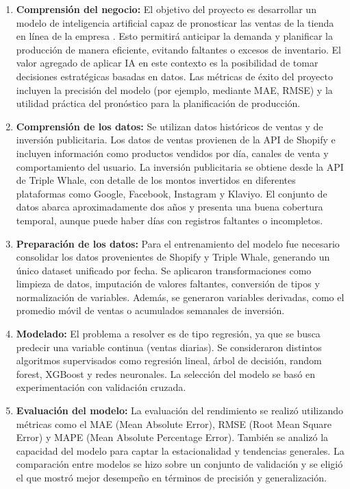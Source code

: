 \documentclass[
11pt, %
]{charter}
\begin{document}
\begin{enumerate}
  \item \textbf{Comprensión del negocio:}  
  El objetivo del proyecto es desarrollar un modelo de inteligencia artificial capaz de pronosticar las ventas de la tienda en línea de la empresa \empclientename. Esto permitirá anticipar la demanda y planificar la producción de manera eficiente, evitando faltantes o excesos de inventario. El valor agregado de aplicar IA en este contexto es la posibilidad de tomar decisiones estratégicas basadas en datos. Las métricas de éxito del proyecto incluyen la precisión del modelo (por ejemplo, mediante MAE, RMSE) y la utilidad práctica del pronóstico para la planificación de producción.

  \item \textbf{Comprensión de los datos:}  
  Se utilizan datos históricos de ventas y de inversión publicitaria. Los datos de ventas provienen de la API de Shopify e incluyen información como productos vendidos por día, canales de venta y comportamiento del usuario. La inversión publicitaria se obtiene desde la API de Triple Whale, con detalle de los montos invertidos en diferentes plataformas como Google, Facebook, Instagram y Klaviyo. El conjunto de datos abarca aproximadamente dos años y presenta una buena cobertura temporal, aunque puede haber días con registros faltantes o incompletos.

  \item \textbf{Preparación de los datos:}  
  Para el entrenamiento del modelo fue necesario consolidar los datos provenientes de Shopify y Triple Whale, generando un único dataset unificado por fecha. Se aplicaron transformaciones como limpieza de datos, imputación de valores faltantes, conversión de tipos y normalización de variables. Además, se generaron variables derivadas, como el promedio móvil de ventas o acumulados semanales de inversión.

  \item \textbf{Modelado:}  
  El problema a resolver es de tipo regresión, ya que se busca predecir una variable continua (ventas diarias). Se consideraron distintos algoritmos supervisados como regresión lineal, árbol de decisión, random forest, XGBoost y redes neuronales. La selección del modelo se basó en experimentación con validación cruzada.

  \item \textbf{Evaluación del modelo:}  
  La evaluación del rendimiento se realizó utilizando métricas como el MAE (Mean Absolute Error), RMSE (Root Mean Square Error) y MAPE (Mean Absolute Percentage Error). También se analizó la capacidad del modelo para captar la estacionalidad y tendencias generales. La comparación entre modelos se hizo sobre un conjunto de validación y se eligió el que mostró mejor desempeño en términos de precisión y generalización.


\end{enumerate}
\end{document}
